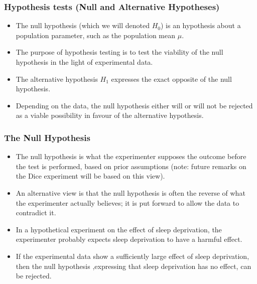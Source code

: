 ﻿\documentclass[a4]{beamer}
\begin{document}
\begin{frame}
\frametitle{Hypothesis tests (Null and Alternative Hypotheses) }
\large
\begin{itemize}
\item The null hypothesis (which we will denoted $H_0$) is an hypothesis about a population parameter, such as the population mean $\mu$. \item The purpose of hypothesis testing is to test the viability of the null hypothesis in the light of experimental data. \item The alternative hypothesis $H_1$ expresses the exact opposite of the null hypothesis. \item Depending on the data, the null hypothesis either will or will not be rejected as a viable possibility in favour of the alternative hypothesis.
\end{itemize}

\end{frame}



\begin{frame}
\frametitle{The Null Hypothesis }
\large
\begin{itemize}
\item The null hypothesis is what the experimenter supposes the outcome before the test is performed, based on prior assumptions (note:  future remarks on the Dice experiment will be based on this view).
\item An alternative view is that the null hypothesis is often the reverse of what the experimenter actually believes; it is put forward to allow the data to contradict it. \item In a hypothetical experiment on the effect of sleep deprivation, the experimenter probably expects sleep deprivation to have a harmful effect. \item If the experimental data show a sufficiently large effect of sleep deprivation, then the null hypothesis ,expressing that sleep deprivation has no effect, can be rejected.
\end{itemize}
\end{frame}
\end{document}
